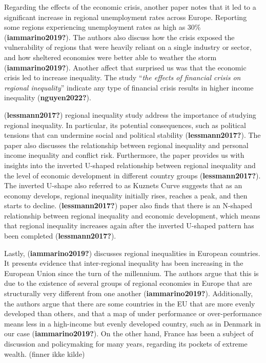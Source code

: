 \documentclass[
  a4paper,
  DIV=11,
  numbers=noendperiod]{scrartcl}
\begin{document}
Regarding the effects of the economic crisis, another paper notes that
it led to a significant increase in regional unemployment rates across
Europe. Reporting some regions experiencing unemployment rates as high
as 30\% (\textbf{iammarino2019?}). The authors also discuss how the
crisis exposed the vulnerability of regions that were heavily reliant on
a single industry or sector, and how sheltered economies were better
able to weather the storm (\textbf{iammarino2019?}). Another affect that
surprised us was that the economic crisis led to increase inequality.
The study ``\emph{the effects of financial crisis on regional
inequality}'' indicate any type of financial crisis results in higher
income inequality (\textbf{nguyen2022?}).

(\textbf{lessmann2017?}) regional inequality study address the
importance of studying regional inequality. In particular, its potential
consequences, such as political tensions that can undermine social and
political stability (\textbf{lessmann2017?}). The paper also discusses
the relationship between regional inequality and personal income
inequality and conflict risk. Furthermore, the paper provides us with
insights into the inverted U-shaped relationship between regional
inequality and the level of economic development in different country
groups (\textbf{lessmann2017?}). The inverted U-shape also referred to
as Kuznets Curve suggests that as an economy develops, regional
inequality initially rises, reaches a peak, and then starts to decline.
(\textbf{lessmann2017?}) paper also finds that there is an N-shaped
relationship between regional inequality and economic development, which
means that regional inequality increases again after the inverted
U-shaped pattern has been completed (\textbf{lessmann2017?}).

Lastly, (\textbf{iammarino2019?}) discusses regional inequalities in
European countries. It presents evidence that inter-regional inequality
has been increasing in the European Union since the turn of the
millennium. The authors argue that this is due to the existence of
several groups of regional economies in Europe that are structurally
very different from one another (\textbf{iammarino2019?}). Additionally,
the authors argue that there are some countries in the EU that are more
evenly developed than others, and that a map of under performance or
over-performance means less in a high-income but evenly developed
country, such as in Denmark in our case (\textbf{iammarino2019?}). On
the other hand, France has been a subject of discussion and policymaking
for many years, regarding its pockets of extreme wealth. (finner ikke
kilde)
\end{document}
